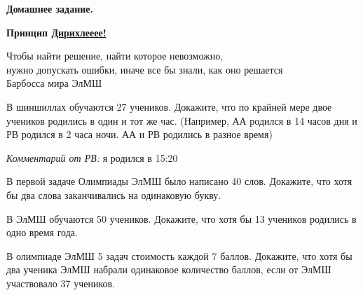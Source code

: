 \hspace{3mm}

\centerline{\bf \Huge Домашнее задание.}
\centerline{\bf \Huge Принцип \href{https://vk.com/video-91031095_456245511}{Дирихлееее!}}

\begin{flushright}
    \scriptsize{Чтобы найти решение, найти которое невозможно, \\
                нужно допускать ошибки, иначе все бы знали, как оно решается\\
                Барбосса мира ЭлМШ}
\end{flushright}

 В шиншиллах обучаются 27 учеников. Докажите, что по крайней мере двое учеников родились в один и тот же час. (Например, АА родился в 14 часов дня и РВ родился в 2 часа ночи. АА и РВ родились в разное время)

\textit{Комментарий от РВ:} я родился в 15:20

 В первой задаче Олимпиады ЭлМШ было написано 40 слов. Докажите, что хотя бы два слова заканчивались на одинаковую букву.

 В ЭлМШ обучаются 50 учеников. Докажите, что хотя бы 13 учеников родились в одно время года.

 В олимпиаде ЭлМШ 5 задач стоимость каждой 7 баллов. Докажите, что хотя бы два ученика ЭлМШ набрали одинаковое количество баллов, если от ЭлМШ участвовало 37 учеников.